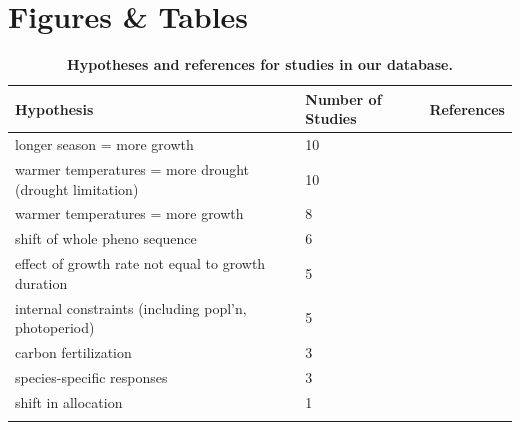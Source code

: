 \documentclass[11pt]{article}
\begin{document}

\clearpage
\section*{Figures \& Tables}

\begingroup\footnotesize
\begin{longtable}{p{}p{}p{}}
\caption{\textbf{Hypotheses and references for studies in our database.}} \\ 
  \hline
Hypothesis & Number of Studies & References \\ 
  \hline \endhead  \hline
longer season = more growth &  10 & \citep{camarero2022decoupled,chen2000,vcufar2015variations,delpierre2017tree,de2022temperature,gao2022earlier,grossiord2022warming,keenan2014net,silvestro2023longer,wheeler2016snow} \\ 
  warmer temperatures = more drought (drought limitation) &  10 & \citep{brand2022,buermann2018widespread,camarero2022decoupled,de2022temperature,drew2018growth,eckes2021,etzold2022number,kolavr2016response,oddi2022contrasting,zhu2021different} \\ 
  warmer temperatures = more growth &   8 & \citep{camarero2022decoupled,dow2022warm,finzi2020,moser2010timing,richardson2010influence,soolanayakanahally2013timing,stridbeck2022,zhang2021drought} \\ 
  shift of whole pheno sequence &   6 & \citep{delpierre2017tree,de2022temperature,richardson2010influence,soolanayakanahally2013timing,zani2020increased,zohner2020interactive} \\ 
  effect of growth rate not equal to growth duration &   5 & \citep{cuny2012life,de2022temperature,francon2020,michelot2012comparing,ren2019} \\ 
  internal constraints (including popl'n, photoperiod) &   5 & \citep{moser2010timing,sebazc2020,soolanayakanahally2013timing,vitasse2009altitudinal,zohner2023effect} \\ 
  carbon fertilization &   3 & \citep{chen1999effects,finzi2020,oddi2022contrasting} \\ 
  species-specific responses &   3 & \citep{cuny2012life,etzold2022number,michelot2012comparing} \\ 
  shift in allocation &   1 & \citep{mckown2016impacts} \\ 
  \hline
\label{tab:ref}
\end{longtable}
\endgroup
\end{document}
